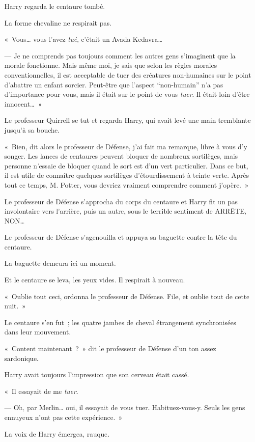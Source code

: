 Harry regarda le centaure tombé.

La forme chevaline ne respirait pas.

«~Vous… vous l'avez \emph{tué}, c'était un Avada Kedavra…

--- Je ne comprends pas toujours comment les autres gens s'imaginent que la morale fonctionne.
Mais même moi, je sais que selon les règles morales conventionnelles, il est acceptable de tuer des créatures non-humaines sur le point d'abattre un enfant sorcier.
Peut-être que l'aspect “non-humain” n'a pas d'importance pour vous, mais il était sur le point de vous \emph{tuer}.
Il était loin d'être innocent…~»

Le professeur Quirrell se tut et regarda Harry, qui avait levé une main tremblante jusqu'à sa bouche.

«~Bien, dit alors le professeur de Défense, j'ai fait ma remarque, libre à vous d'y songer.
Les lances de centaures peuvent bloquer de nombreux sortilèges, mais personne n'essaie de bloquer quand le sort est d'un vert particulier.
Dans ce but, il est utile de connaître quelques sortilèges d'étourdissement à teinte verte.
Après tout ce temps, M. Potter, vous devriez vraiment comprendre comment j'opère.~»

Le professeur de Défense s'approcha du corps du centaure et Harry fit un pas involontaire vers l'arrière, puis un autre, sous le terrible sentiment de ARRÊTE, NON…

Le professeur de Défense s'agenouilla et appuya sa baguette contre la tête du centaure.

La baguette demeura ici un moment.

Et le centaure se leva, les yeux vides.
Il respirait à nouveau.

«~Oublie tout ceci, ordonna le professeur de Défense.
File, et oublie tout de cette nuit.~»

Le centaure s'en fut~; les quatre jambes de cheval étrangement synchronisées dans leur mouvement.

«~Content maintenant~?~»
dit le professeur de Défense d'un ton assez sardonique.

Harry avait toujours l'impression que son cerveau était cassé.

«~Il essayait de me \emph{tuer}.

--- Oh, par Merlin… oui, il essayait de vous tuer.
Habituez-vous-y.
Seuls les gens ennuyeux n'ont pas cette expérience.~»

La voix de Harry émergea, rauque.

